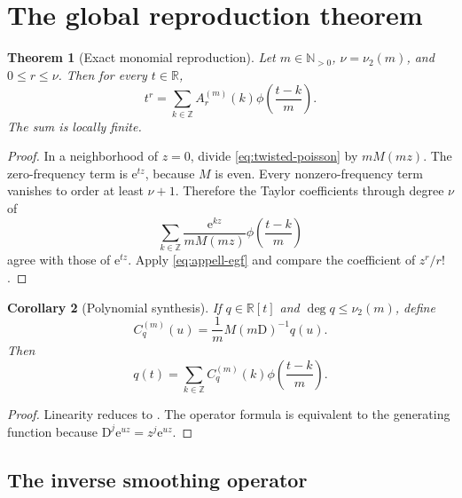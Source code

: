 \documentclass[11pt,oneside]{article}
\newtheorem{theorem}{Theorem}[section]
\newtheorem{corollary}[theorem]{Corollary}
\theoremstyle{definition}
\theoremstyle{remark}
\newcommand{\R}{\mathbb R}
\newcommand{\N}{\mathbb N}
\newcommand{\Z}{\mathbb Z}
\newcommand{\vtwo}{\nu_2}
\newcommand{\e}{\mathrm e}
\newcommand{\D}{\mathrm D}
\begin{document}
\section{The global reproduction theorem}
\label{sec:global-reproduction}

\begin{theorem}[Exact monomial reproduction]
\label{thm:monomial-reproduction}
Let \(m\in\N_{>0}\), \(\nu=\vtwo(m)\), and \(0\le r\le\nu\).  Then for every
\(t\in\R\),
\begin{equation}
 \boxed{\displaystyle
 t^r=\sum_{k\in\Z}A_r^{(m)}(k)
       \phi\!\left(\frac{t-k}{m}\right).}
 \label{eq:monomial-reproduction}
\end{equation}
The sum is locally finite.
\end{theorem}

\begin{proof}
In a neighborhood of \(z=0\), divide \eqref{eq:twisted-poisson} by
\(mM(mz)\).  The zero-frequency term is \(\e^{tz}\), because \(M\) is even.
Every nonzero-frequency term vanishes to order at least \(\nu+1\).  Therefore
the Taylor coefficients through degree \(\nu\) of
\[
 \sum_{k\in\Z}\frac{\e^{kz}}{mM(mz)}
   \phi\!\left(\frac{t-k}{m}\right)
\]
agree with those of \(\e^{tz}\).  Apply \eqref{eq:appell-egf} and compare the
coefficient of \(z^r/r!\).
\end{proof}

\begin{corollary}[Polynomial synthesis]
\label{cor:polynomial-synthesis}
If \(q\in\R[t]\) and \(\deg q\le\vtwo(m)\), define
\begin{equation}
 C_q^{(m)}(u)=\frac1mM(m\D)^{-1}q(u).
 \label{eq:Cq}
\end{equation}
Then
\begin{equation}
 q(t)=\sum_{k\in\Z}C_q^{(m)}(k)
           \phi\!\left(\frac{t-k}{m}\right).
 \label{eq:poly-synthesis}
\end{equation}
\end{corollary}

\begin{proof}
Linearity reduces to .  The operator formula is
equivalent to the generating function because
\(\D^j\e^{uz}=z^j\e^{uz}\).
\end{proof}

\subsection{The inverse smoothing operator}
\end{document}
